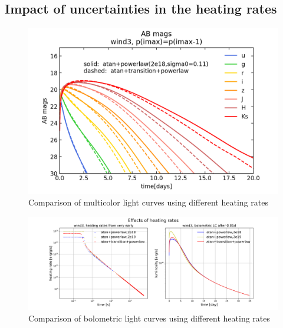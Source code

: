 \documentclass[fleqn,usenatbib]{mnras}
\begin{document}
\subsection{Impact of uncertainties in the heating rates}

\begin{figure}
\centering
\includegraphics[scale=0.65]{figures/heating/ABmags_wind3_a_Apr2_zb}
\caption{Comparison of multicolor light curves using different heating rates}
\label{heating_multicolor}
\end{figure}

\begin{figure}
\centering
\includegraphics[scale=0.25]{figures/heating/LC_heating_wind3_a_Apr2}
\caption{Comparison of bolometric light curves using different heating rates}
\label{heating_Lbol}
\end{figure}
\end{document}
